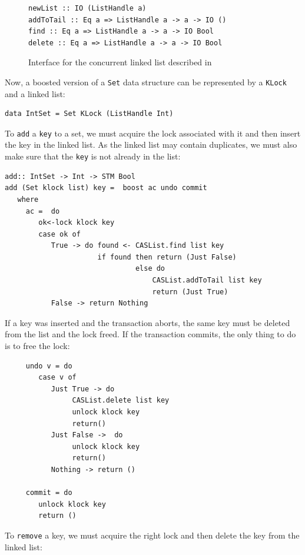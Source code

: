 \documentclass{llncs}
\begin{document}
\begin{figure}[!ht]
{\small\begin{verbatim}
newList :: IO (ListHandle a)
addToTail :: Eq a => ListHandle a -> a -> IO ()
find :: Eq a => ListHandle a -> a -> IO Bool
delete :: Eq a => ListHandle a -> a -> IO Bool
\end{verbatim}}
\caption{Interface for the concurrent linked list described in \cite{linkedlist}}
\label{fig:linkedlist}
\end{figure}


Now, a boosted version of a  {\tt Set} data structure can
be represented by a {\tt KLock} and a linked list:

{\small\begin{verbatim}
data IntSet = Set KLock (ListHandle Int)
\end{verbatim}}

To {\tt add} a {\tt key} to a set, we must acquire the lock associated with it
and then insert the key in the linked list. As the linked list may contain
duplicates, we must also make sure that the {\tt key} is not already in the list:

{\small\begin{verbatim}
add:: IntSet -> Int -> STM Bool
add (Set klock list) key =  boost ac undo commit 
   where
     ac =  do
        ok<-lock klock key
        case ok of
           True -> do found <- CASList.find list key
                      if found then return (Just False)	
                               else do 
                                   CASList.addToTail list key
                                   return (Just True)
           False -> return Nothing
\end{verbatim}}
If a key was inserted and the transaction aborts, the same key must be deleted from the list and
the lock freed. If the transaction commits, the only thing to do is to free the lock:
{\small\begin{verbatim}
     undo v = do
        case v of
           Just True -> do
                CASList.delete list key
                unlock klock key
                return()
           Just False ->  do
                unlock klock key
                return()
           Nothing -> return ()
     
     commit = do 
        unlock klock key
        return ()
\end{verbatim}}


To {\tt remove} a key, we must acquire the right lock and then delete
the key from the linked list:
\end{document}

